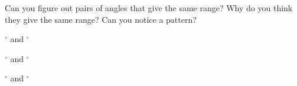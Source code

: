 \documentclass[10pt]{exam}
\begin{document}
\begin{questions}
    
    \question 
      Can you figure out pairs of angles that give the same range?  Why do you think they give the same range?  Can you notice a pattern? 

      \vspace{1em}
      \fillin[][3em]$^\circ$ and \fillin[][3em]$^\circ$
      
      \vspace{1em}
      \fillin[][3em]$^\circ$ and \fillin[][3em]$^\circ$

      \vspace{1em}
      \fillin[][3em]$^\circ$ and \fillin[][3em]$^\circ$

\end{questions}
\end{document}
